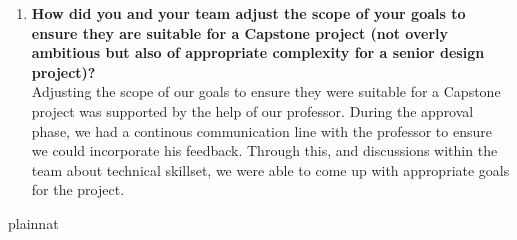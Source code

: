\documentclass{article}
\begin{document}
\begin{enumerate}
    \item {\bf How did you and your team adjust the scope of your goals to ensure
    they are suitable for a Capstone project (not overly ambitious but also of
    appropriate complexity for a senior design project)?}\\
    Adjusting the scope of our goals to ensure they were suitable for a Capstone project was supported by the help of our professor. During 
    the approval phase, we had a continous communication line with the professor to ensure we could incorporate his feedback. Through this, 
    and discussions within the team about technical skillset, we were able to come up with appropriate goals for the project.
    
\end{enumerate}  

 {plainnat}

\end{document}
